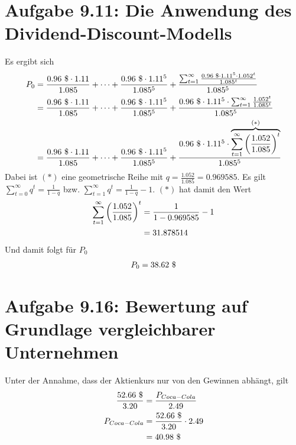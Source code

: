 \documentclass{article}
\begin{document}
	\section*{Aufgabe 9.11: Die Anwendung des Dividend-Discount-Modells}
	Es ergibt sich
	\begin{align}
		P_0 &= \frac{0.96\text{ \$}\cdot 1.11}{1.085} + \dots + \frac{0.96\text{ \$}\cdot 1.11^5}{1.085^5} + \frac{\sum_{t=1}^{\infty} \frac{0.96\text{ \$}\cdot 1.11^5\cdot 1.052^t}{1.085^t}}{1.085^5} \notag \\
		&= \frac{0.96\text{ \$}\cdot 1.11}{1.085} + \dots + \frac{0.96\text{ \$}\cdot 1.11^5}{1.085^5} + \frac{0.96\text{ \$}\cdot 1.11^5\cdot\sum_{t=1}^{\infty} \frac{1.052^t}{1.085^t}}{1.085^5} \notag \\
		&= \frac{0.96\text{ \$}\cdot 1.11}{1.085} + \dots + \frac{0.96\text{ \$}\cdot 1.11^5}{1.085^5} + \frac{0.96\text{ \$}\cdot 1.11^5\cdot\overbrace{\sum_{t=1}^{\infty} \left(\frac{1.052}{1.085}\right)^t}^{(\ast)}}{1.085^5} \notag
	\end{align}
	Dabei ist $(\ast)$ eine geometrische Reihe mit $q=\frac{1.052}{1.085}=0.969585$. Es gilt $\sum_{t=0}^\infty q^t = \frac{1}{1-q}$ bzw. $\sum_{t=1}^\infty q^t=\frac{1}{1-q}-1$. $(\ast)$ hat damit den Wert
	\begin{align}
		\sum_{t=1}^\infty \left(\frac{1.052}{1.085}\right)^t &= \frac{1}{1-0.969585}-1 \notag \\
		&= 31.878514 \notag
	\end{align}
	Und damit folgt für $P_0$
	\begin{align}
		P_0 = 38.62 \text{ \$} \notag
	\end{align}
	
	\section*{Aufgabe 9.16: Bewertung auf Grundlage vergleichbarer Unternehmen}
	Unter der Annahme, dass der Aktienkurs nur von den Gewinnen abhängt, gilt
	\begin{align}
		\frac{52.66\text{ \$}}{3.20} &= \frac{P_{Coca-Cola}}{2.49} \notag \\
		P_{Coca-Cola} &= \frac{52.66\text{ \$}}{3.20} \cdot 2.49 \notag \\
		&= 40.98 \text{ \$} \notag
	\end{align}
\end{document}
